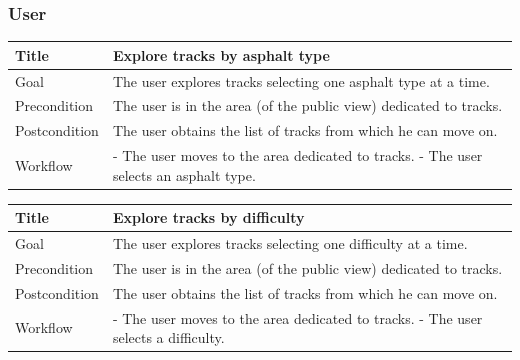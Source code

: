 \documentclass{beamer}
\begin{document}


\begin{frame}
    \frametitle{User}
    \begin{table}
        \tiny
        \begin{tabular}{|p{2cm}|p{6cm}|}
        \hline
        Title & \textbf{Explore tracks by asphalt type} \\
        \hline
        Goal & The user explores tracks selecting one asphalt type at a time. \\
        \hline
        Precondition & The user is in the area (of the public view) dedicated to tracks.\\
        \hline
        Postcondition & The user obtains the list of tracks from which he can move on.\\
        \hline
        Workflow &
        - The user moves to the area dedicated to tracks. \newline
        - The user selects an asphalt type. \\
        \hline
        \end{tabular}
\end{table}

\begin{table}
    \tiny
    \begin{tabular}{|p{2cm}|p{6cm}|}
    \hline
    Title & \textbf{Explore tracks by difficulty} \\
    \hline
    Goal & The user explores tracks selecting one difficulty at a time. \\
    \hline
    Precondition & The user is in the area (of the public view) dedicated to tracks.\\
    \hline
    Postcondition & The user obtains the list of tracks from which he can move on.\\
    \hline
    Workflow &
    - The user moves to the area dedicated to tracks. \newline
    - The user selects a difficulty. \\
    \hline
    \end{tabular}
\end{table}
\end{frame}


\end{document}
